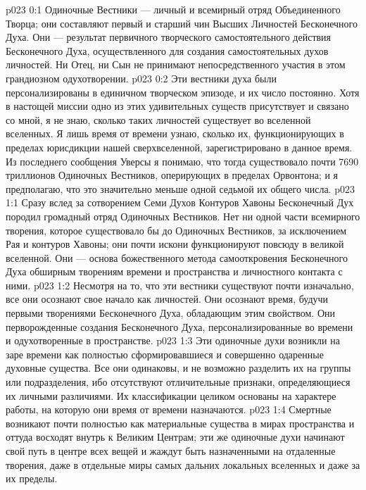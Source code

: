 \vs p023 0:1 Одиночные Вестники --- личный и всемирный отряд Объединенного Творца; они составляют первый и старший чин Высших Личностей Бесконечного Духа. Они --- результат первичного творческого самостоятельного действия Бесконечного Духа, осуществленного для создания самостоятельных духов личностей. Ни Отец, ни Сын не принимают непосредственного участия в этом грандиозном одухотворении.
\vs p023 0:2 Эти вестники духа были персонализированы в единичном творческом эпизоде, и их число постоянно. Хотя в настощей миссии одно из этих удивительных существ присутствует и связано со мной, я не знаю, сколько таких личностей существует во вселенной вселенных. Я лишь время от времени узнаю, сколько их, функционирующих в пределах юрисдикции нашей сверхвселенной, зарегистрировано в данное время. Из последнего сообщения Уверсы я понимаю, что тогда существовало почти 7690 триллионов Одиночных Вестников, оперирующих в пределах Орвонтона; и я предполагаю, что это значительно меньше одной седьмой их общего числа.
\vs p023 1:1 Сразу вслед за сотворением Семи Духов Контуров Хавоны Бесконечный Дух породил громадный отряд Одиночных Вестников. Нет ни одной части всемирного творения, которое существовало бы до Одиночных Вестников, за исключением Рая и контуров Хавоны; они почти искони функционируют повсюду в великой вселенной. Они --- основа божественного метода самооткровения Бесконечного Духа обширным творениям времени и пространства и личностного контакта с ними.
\vs p023 1:2 Несмотря на то, что эти вестники существуют почти изначально, все они осознают свое начало как личностей. Они осознают время, будучи первыми творениями Бесконечного Духа, обладающим этим свойством. Они перворожденные создания Бесконечного Духа, персонализированные во времени и одухотворенные в пространстве.
\vs p023 1:3 Эти одиночные духи возникли на заре времени как полностью сформировавшиеся и совершенно одаренные духовные существа. Все они одинаковы, и не возможно разделить их на группы или подразделения, ибо отсутствуют отличительные признаки, определяющиеся их личными различиями. Их классификации целиком основаны на характере работы, на которую они время от времени назначаются.
\vs p023 1:4 Смертные возникают почти полностью как материальные существа в мирах пространства и оттуда восходят внутрь к Великим Центрам; эти же одиночные духи начинают свой путь в центре всех вещей и жаждут быть назначенными на отдаленные творения, даже в отдельные миры самых дальних локальных вселенных и даже за их пределы.
